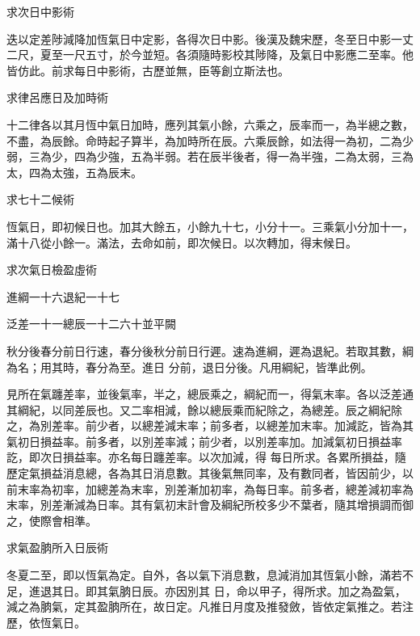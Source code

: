 \begin{pinyinscope}
 求次日中影術



 迭以定差陟減降加恆氣日中定影，各得次日中影。後漢及魏宋歷，冬至日中影一丈二尺，夏至一尺五寸，於今並短。各須隨時影校其陟降，及氣日中影應二至率。他
 皆仿此。前求每日中影術，古歷並無，臣等創立斯法也。



 求律呂應日及加時術



 十二律各以其月恆中氣日加時，應列其氣小餘，六乘之，辰率而一，為半總之數，不盡，為辰餘。命時起子算半，為加時所在辰。六乘辰餘，如法得一為初，二為少弱，三為少，四為少強，五為半弱。若在辰半後者，得一為半強，二為太弱，三為太，四為太強，五為辰末。



 求七十二候術



 恆氣日，即初候日也。加其大餘五，小餘九十七，小分十一。三乘氣小分加十一，滿十八從小餘一。滿法，去命如前，即次候日。以次轉加，得末候日。



 求次氣日檢盈虛術



 進綱一十六退紀一十七



 泛差一十一總辰一十二六十並平闕



 秋分後春分前日行速，春分後秋分前日行遲。速為進綱，遲為退紀。若取其數，綱為名；用其時，春分為至。進日
 分前，退日分後。凡用綱紀，皆準此例。



 見所在氣躔差率，並後氣率，半之，總辰乘之，綱紀而一，得氣末率。各以泛差通其綱紀，以同差辰也。又二率相減，餘以總辰乘而紀除之，為總差。辰之綱紀除之，為別差率。前少者，以總差減末率；前多者，以總差加末率。加減訖，皆為其氣初日損益率。前多者，以別差率減；前少者，以別差率加。加減氣初日損益率訖，即次日損益率。亦名每日躔差率。以次加減，得
 每日所求。各累所損益，隨歷定氣損益消息總，各為其日消息數。其後氣無同率，及有數同者，皆因前少，以前末率為初率，加總差為末率，別差漸加初率，為每日率。前多者，總差減初率為末率，別差漸減為日率。其有氣初末計會及綱紀所校多少不葉者，隨其增損調而御之，使際會相準。



 求氣盈朒所入日辰術



 冬夏二至，即以恆氣為定。自外，各以氣下消息數，息減消加其恆氣小餘，滿若不足，進退其日。即其氣朒日辰。亦因別其
 日，命以甲子，得所求。加之為盈氣，減之為朒氣，定其盈朒所在，故日定。凡推日月度及推發斂，皆依定氣推之。若注歷，依恆氣日。




\end{pinyinscope}
